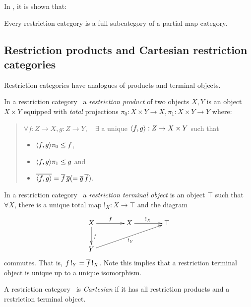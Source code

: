 In \cite{cockettlack2003:restcategories2}, it is shown that:
\begin{theorem}
  Every restriction category is a full subcategory of a partial map category.
\end{theorem}
\subsection{Restriction products and Cartesian restriction categories} %
\label{sub:restriction_products_and_cartesian_restriction_categories}


Restriction categories have analogues of products and terminal objects.

\begin{definition}
  In a restriction category \X\, a \emph{restriction product}  of two objects $X, Y$ is an
  object $X\times Y$ equipped with \emph{total} projections
  $\pi_0:X\times Y\to X, \pi_1:X\times Y\to Y $ where:
  \begin{quote}
    $\forall f:Z\to X, g: Z\to Y,\quad \exists$ a unique $\langle f,g\rangle:Z \to X\times Y$ such that
    \begin{itemize}
      \item $\langle f,g\rangle \pi_0 \le f$,
      \item $\langle f,g\rangle \pi_1 \le g$ and
      \item $\overline{\langle f,g\rangle} = \overline{f}\, \overline{g} ( = \overline{g}\, \overline{f})$.
    \end{itemize}
  \end{quote}
\end{definition}

\begin{definition}
  In a restriction category \X\, a \emph{restriction terminal object}
  is an object $\top$ such that $\forall X$, there is a
  unique total map $!_X : X \to \top$ and the diagram
  \[
    \xymatrix @C=40pt @R=25pt{
      X \ar[r]^{\restr{f}} \ar[d]^{f} & X \ar[r]^{!_X}  &\top  \\
      Y \ar[urr]_{!_Y}
    }
  \]
  commutes. That is,  $f\, !_Y = \overline{f}\, !_X$. Note this implies
  that a restriction terminal object is unique up to a unique isomorphism.
\end{definition}

\begin{definition}
  A restriction category \X\ is \emph{Cartesian} if it has all restriction products
  and a restriction terminal object.
\end{definition}

